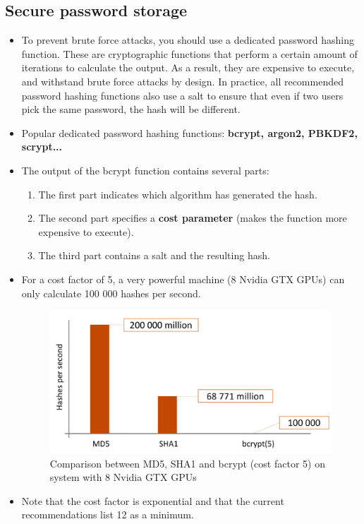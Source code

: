 \documentclass[../main.tex]{subfiles}
\begin{document}
\subsection{Secure password storage}
\begin{itemize}
\item To prevent brute force attacks, you should use a dedicated password hashing function. These are cryptographic functions that perform a certain amount of iterations to calculate the output. As a result, they are expensive to execute, and withstand brute force attacks by design. In practice, all recommended password hashing functions also use a salt to ensure that even if two users pick the same password, the hash will be different.
\item Popular dedicated password hashing functions: \textbf{bcrypt, argon2, PBKDF2, scrypt...}
\item The output of the bcrypt function contains several parts: 
\begin{enumerate}
\item The first part indicates which algorithm has generated the hash.
\item The second part specifies a \textbf{cost parameter} (makes the function more expensive to execute).
\item The third part contains a salt and the resulting hash.
\end{enumerate} 
\item For a cost factor of 5, a very powerful machine (8 Nvidia GTX GPUs) can only calculate 100 000 hashes per second.
\begin{figure}[h!]
\includegraphics[width=\textwidth]{../images/bcrypt}
\caption{Comparison between MD5, SHA1 and bcrypt (cost factor 5) on system with 8 Nvidia GTX GPUs}
\end{figure}
\item Note that the cost factor is exponential and that the current recommendations list 12 as a minimum.

\end{itemize}
\end{document}
